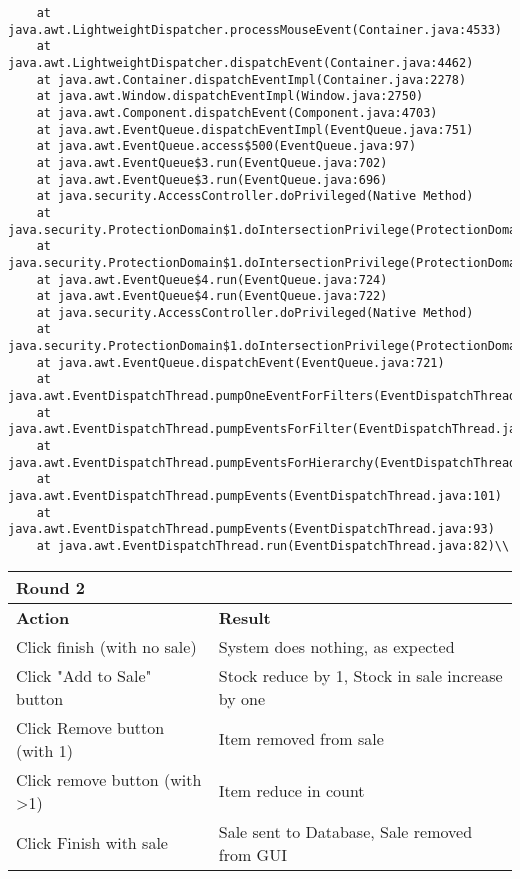 \documentclass[11pt,a4paper]{article}
\begin{document}
\begin{lstlisting}
	at java.awt.LightweightDispatcher.processMouseEvent(Container.java:4533)
	at java.awt.LightweightDispatcher.dispatchEvent(Container.java:4462)
	at java.awt.Container.dispatchEventImpl(Container.java:2278)
	at java.awt.Window.dispatchEventImpl(Window.java:2750)
	at java.awt.Component.dispatchEvent(Component.java:4703)
	at java.awt.EventQueue.dispatchEventImpl(EventQueue.java:751)
	at java.awt.EventQueue.access$500(EventQueue.java:97)
	at java.awt.EventQueue$3.run(EventQueue.java:702)
	at java.awt.EventQueue$3.run(EventQueue.java:696)
	at java.security.AccessController.doPrivileged(Native Method)
	at java.security.ProtectionDomain$1.doIntersectionPrivilege(ProtectionDomain.java:75)
	at java.security.ProtectionDomain$1.doIntersectionPrivilege(ProtectionDomain.java:86)
	at java.awt.EventQueue$4.run(EventQueue.java:724)
	at java.awt.EventQueue$4.run(EventQueue.java:722)
	at java.security.AccessController.doPrivileged(Native Method)
	at java.security.ProtectionDomain$1.doIntersectionPrivilege(ProtectionDomain.java:75)
	at java.awt.EventQueue.dispatchEvent(EventQueue.java:721)
	at java.awt.EventDispatchThread.pumpOneEventForFilters(EventDispatchThread.java:201)
	at java.awt.EventDispatchThread.pumpEventsForFilter(EventDispatchThread.java:116)
	at java.awt.EventDispatchThread.pumpEventsForHierarchy(EventDispatchThread.java:105)
	at java.awt.EventDispatchThread.pumpEvents(EventDispatchThread.java:101)
	at java.awt.EventDispatchThread.pumpEvents(EventDispatchThread.java:93)
	at java.awt.EventDispatchThread.run(EventDispatchThread.java:82)\\
	\end{lstlisting}
	\newpage
\begin{tabular}{|m{7cm}|m{7cm}|}
		\hline Round 2\\
		\hline \textbf{Action} & \textbf{Result}\\
		\hline Click finish (with no sale) & System does nothing, as expected\\
		\hline  Click "Add to Sale" button& Stock reduce by 1, Stock in sale increase by one\\
		\hline Click Remove button (with 1)& Item removed from sale\\
		\hline  Click remove button (with >1) & Item reduce in count\\
		\hline Click Finish with sale& Sale sent to Database, Sale removed from GUI \\
		\hline 
	\end{tabular}
	
	
\end{document}
